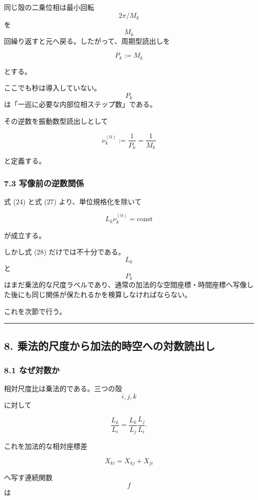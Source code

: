 \documentclass[
  a4paper,
]{ltjsarticle}
\begin{document}
同じ殻の二乗位相は最小回転 \[2\pi/M_k\] を \[M_k\]
回繰り返すと元へ戻る。したがって、周期型読出しを

\[
\boxed{
P_k:=M_k
}
\tag{26}
\]

とする。

ここでも秒は導入していない。\[P_k\]
は「一巡に必要な内部位相ステップ数」である。

その逆数を振動数型読出しとして

\[
\boxed{
\nu_k^{(0)}:=\frac{1}{P_k}
=\frac{1}{M_k}
}
\tag{27}
\]

と定義する。

\subsubsection{7.3
写像前の逆数関係}\label{ux5199ux50cfux524dux306eux9006ux6570ux95a2ux4fc2}

式 (24) と式 (27) より、単位規格化を除いて

\[
\boxed{
L_k\nu_k^{(0)}
=\mathrm{const}
}
\tag{28}
\]

が成立する。

しかし式 (28) だけでは不十分である。\[L_k\] と \[P_k\]
はまだ乗法的な尺度ラベルであり、通常の加法的な空間座標・時間座標へ写像した後にも同じ関係が保たれるかを検算しなければならない。

これを次節で行う。

\begin{center}\rule{0.5\linewidth}{0.5pt}\end{center}

\subsection{8.
乗法的尺度から加法的時空への対数読出し}\label{ux4e57ux6cd5ux7684ux5c3aux5ea6ux304bux3089ux52a0ux6cd5ux7684ux6642ux7a7aux3078ux306eux5bfeux6570ux8aadux51faux3057}

\subsubsection{8.1 なぜ対数か}\label{ux306aux305cux5bfeux6570ux304b}

相対尺度比は乗法的である。三つの殻 \[i,j,k\] に対して

\[
\frac{L_k}{L_i}
=
\frac{L_k}{L_j}\frac{L_j}{L_i}.
\tag{29}
\]

これを加法的な相対座標差

\[
X_{ki}=X_{kj}+X_{ji}
\]

へ写す連続関数 \[f\] は
\end{document}
